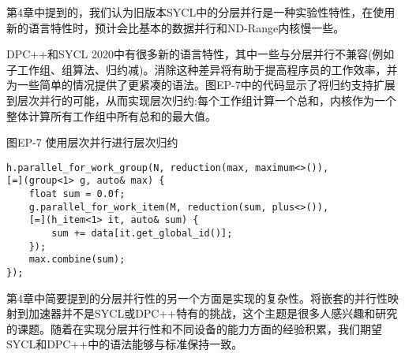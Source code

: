 第4章中提到的，我们认为旧版本SYCL中的分层并行是一种实验性特性，在使用新的语言特性时，预计会比基本的数据并行和ND-Range内核慢一些。\par

DPC++和SYCL 2020中有很多新的语言特性，其中一些与分层并行不兼容(例如子工作组、组算法、归约减)。消除这种差异将有助于提高程序员的工作效率，并为一些简单的情况提供了更紧凑的语法。图EP-7中的代码显示了将归约支持扩展到层次并行的可能，从而实现层次归约:每个工作组计算一个总和，内核作为一个整体计算所有工作组中所有总和的最大值。\par

\hspace*{\fill} \par %
图EP-7 使用层次并行进行层次归约
\begin{lstlisting}[caption={}]
h.parallel_for_work_group(N, reduction(max, maximum<>()),
[=](group<1> g, auto& max) {
	float sum = 0.0f;
	g.parallel_for_work_item(M, reduction(sum, plus<>()),
	[=](h_item<1> it, auto& sum) {
		sum += data[it.get_global_id()];
	});
	max.combine(sum);
});
\end{lstlisting}

第4章中简要提到的分层并行性的另一个方面是实现的复杂性。将嵌套的并行性映射到加速器并不是SYCL或DPC++特有的挑战，这个主题是很多人感兴趣和研究的课题。随着在实现分层并行性和不同设备的能力方面的经验积累，我们期望SYCL和DPC++中的语法能够与标准保持一致。\par
















































